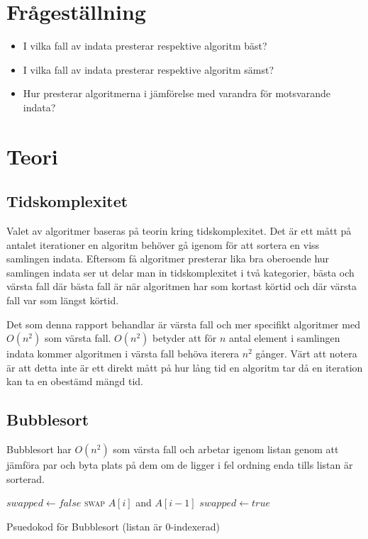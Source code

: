 \documentclass[a4paper]{article}
\begin{document}
\section{Frågeställning}
\begin{itemize}
	\item I vilka fall av indata presterar respektive algoritm bäst?
	\item I vilka fall av indata presterar respektive algoritm sämst?
	\item Hur presterar algoritmerna i jämförelse med varandra för motsvarande indata?
\end{itemize}

\section{Teori}
\subsection{Tidskomplexitet}
Valet av algoritmer baseras på teorin kring tidskomplexitet. Det är ett mått på antalet iterationer en algoritm behöver gå igenom för att sortera en viss samlingen indata. Eftersom få algoritmer presterar lika bra oberoende hur samlingen indata ser ut delar man in tidskomplexitet i två kategorier, bästa och värsta fall där bästa fall är när algoritmen har som kortast körtid och där värsta fall var som längst körtid.

Det som denna rapport behandlar är värsta fall och mer specifikt algoritmer med $O(n^2)$ som värsta fall. $O(n^2)$ betyder att för $n$ antal element i samlingen indata kommer algoritmen i värsta fall behöva iterera $n^2$ gånger. Värt att notera är att detta inte är ett direkt mått på hur lång tid en algoritm tar då en iteration kan ta en obestämd mängd tid. 

\subsection{Bubblesort}
Bubblesort har $O(n^2)$ som värsta fall och arbetar igenom listan genom att jämföra par och byta plats på dem om de ligger i fel ordning enda tills listan är sorterad.\cite{bubble}
\begin{algorithm}
\begin{algorithmic}
	\State $swapped \gets false$
			\State \textsc{swap} $A[i]$ and $A[i-1]$
			\State $swapped \gets true$
		\EndIf
	\EndFor
\EndWhile
\EndFunction
\end{algorithmic}
\caption{Psuedokod för Bubblesort (listan är 0-indexerad)}
\end{algorithm}
\end{document}
